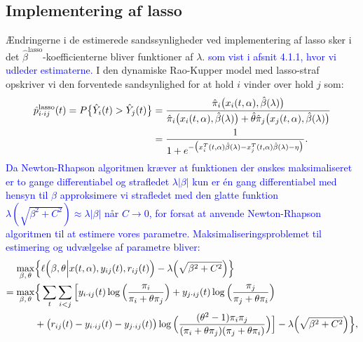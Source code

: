\documentclass[11pt,a4paper]{article}
\begin{document}
\subsection{Implementering af lasso}
Ændringerne i de estimerede sandssynligheder ved implementering af lasso sker i det $\hat{\beta}^{\text{lasso}}$-koefficienterne bliver funktioner af $\lambda$. \textcolor{blue}{som vist i afsnit 4.1.1, hvor vi udleder estimaterne.} I den dynamiske Rao-Kupper model med lasso-straf opskriver vi den forventede sandsynlighed for at hold $i$ vinder over hold $j$ som:
\begin{align}
    \hat{p}^{\text{lasso}}_{i\cdot ij}(t)=P\big{\{}\hat{Y}_{i}(t)>\hat{Y}_{j}(t)\big{\}}
    &=\frac{\hat{\pi}_i\big{(}x_i(t,\alpha),\hat{\beta}(\lambda)\big{)}}{\hat{\pi}_i\big{(}x_i(t,\alpha),\hat{\beta}(\lambda)\big{)}+\hat{\theta}\hat{\pi}_j\big{(}x_j(t,\alpha),\hat{\beta}(\lambda)\big{)}}\\
    &=\frac{1}{1+e^{-\big{(}x_i^T(t,\alpha)\hat{\beta}(\lambda)-x_j^T(t,\alpha)\hat{\beta}(\lambda)-\eta\big{)}}}.
    \label{func:pdynlasso}
\end{align}
\textcolor{blue}{Da Newton-Rhapson algoritmen kræver at funktionen der ønskes maksimaliseret er to gange differentiabel og strafledet $\lambda |\beta|$ kun er én gang differentiabel med hensyn til $\beta$ approksimere vi strafledet med den glatte funktion $\lambda(\sqrt{\beta^2+C^2})\approx\lambda |\beta|$ når $C\rightarrow 0$, for forsat at anvende Newton-Rhapson algoritmen til at estimere vores parametre. Maksimaliseringsproblemet til estimering og udvælgelse af parametre bliver:}
\begin{align*}
\max_{\beta,\,\theta} &\Big{\{}\ell\Big{(}\beta,\theta\Big{|}x(t,\alpha),y_{ij}(t),r_{ij}(t)\Big{)}-\lambda \Big{(}\sqrt{\beta^2+C^2}\Big{)}\Big{\}}\\
=\max_{\beta,\,\theta} 
&\Big{\{}\sum_{t}\sum_{i<j}\Big{[}y_{i\cdot ij}(t)\log\Big{(}\frac{\pi_i}{\pi_i+\theta\pi_j}\Big{)}
+ y_{j\cdot ij}(t)\log\Big{(}\frac{\pi_j}{\pi_j+\theta\pi_i}\Big{)}\\
&+ \big{(}r_{ij}(t)-y_{i\cdot ij}(t)-y_{j\cdot ij}(t)\big{)} \log\Big{(}\frac{(\theta^2-1)\pi_i \pi_j}{(\pi_i+\theta\pi_j)(\pi_j+\theta\pi_i)}\Big{)}\Big{]}-\lambda \Big{(}\sqrt{\beta^2+C^2}\Big{)}\Big{\}},
\end{align*}
\end{document}
